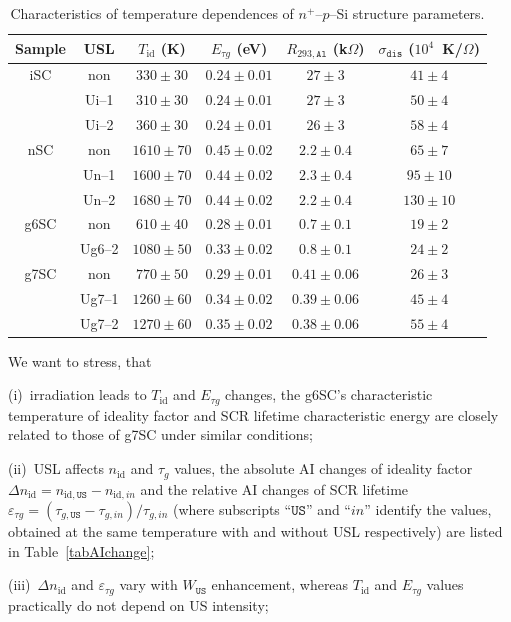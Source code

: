 \documentclass[aip,jap, amsmath,amssymb,reprint]{revtex4-1}
\begin{document}
\begin{table}
\caption{\label{tabTpar}Characteristics of temperature dependences of $n^+$--$p$--Si structure parameters.
}
\begin{ruledtabular}
\begin{tabular}{cccccc}
Sample&USL&$T_{\mathrm{id}}$ (K)&$E_{\tau g}$ (eV)&$R_{293,\mathtt{Al}}$ (k$\Omega$)&$\sigma_{\mathtt{dis}}$ ($10^4$~K/$\Omega$)\\
\hline
iSC&non&$330\pm30$&$0.24\pm0.01$&$27\pm3$&$41\pm4$\\
&Ui--1&$310\pm30$&$0.24\pm0.01$&$27\pm3$&$50\pm4$\\
&Ui--2&$360\pm30$&$0.24\pm0.01$&$26\pm3$&$58\pm4$\\
nSC&non&$1610\pm70$&$0.45\pm0.02$&$2.2\pm0.4$&$65\pm7$\\
&Un--1&$1600\pm70$&$0.44\pm0.02$&$2.3\pm0.4$&$95\pm10$\\
&Un--2&$1680\pm70$&$0.44\pm0.02$&$2.2\pm0.4$&$130\pm10$\\
g6SC&non&$610\pm40$&$0.28\pm0.01$&$0.7\pm0.1$&$19\pm2$\\
&Ug6--2&$1080\pm50$&$0.33\pm0.02$&$0.8\pm0.1$&$24\pm2$\\
g7SC&non&$770\pm50$&$0.29\pm0.01$&$0.41\pm0.06$&$26\pm3$\\
&Ug7--1&$1260\pm60$&$0.34\pm0.02$&$0.39\pm0.06$&$45\pm4$\\
&Ug7--2&$1270\pm60$&$0.35\pm0.02$&$0.38\pm0.06$&$55\pm4$\\
\end{tabular}
\end{ruledtabular}
\end{table}

We want to stress, that

\noindent
(i)~irradiation leads to $T_{\mathrm{id}}$ and $E_{\tau g}$ changes, the g6SC's characteristic temperature of ideality factor and SCR lifetime characteristic energy are closely related to those of g7SC under similar conditions;

\noindent
(ii)~USL affects $n_{\mathrm{id}}$ and $\tau_g$ values,
the absolute AI changes of ideality factor $\Delta n_{\mathrm{id}}=n_{\mathrm{id},\mathtt{US}}-n_{\mathrm{id},in}$ and
the relative AI changes of SCR lifetime $\varepsilon_{\tau g}=(\tau_{g,\mathtt{US}}-\tau_{g,in})/\tau_{g,in}$
(where subscripts ``$\mathtt{US}$'' and ``$in$'' identify the values,
obtained at the same temperature with and without USL respectively)
are listed in Table~\ref{tabAIchange};

\noindent
(iii)~$\Delta n_{\mathrm{id}}$ and $\varepsilon_{\tau g}$ vary with $W_{\mathtt{US}}$ enhancement, whereas $T_{\mathrm{id}}$ and $E_{\tau g}$ values practically do not depend on US intensity;
\end{document}
